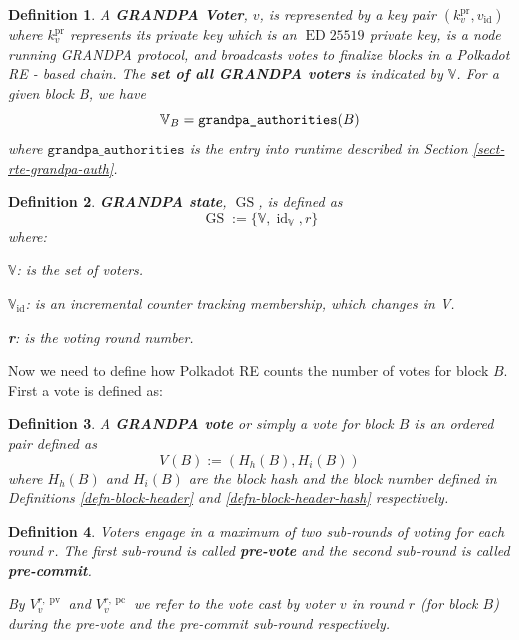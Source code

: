 \documentclass{book}
\newcommand{\assign}{:=}
\newcommand{\nosymbol}{}
\newcommand{\tmop}[1]{\ensuremath{\operatorname{#1}}}
\newcommand{\tmstrong}[1]{\textbf{#1}}
\newcommand{\tmverbatim}[1]{{\ttfamily{#1}}}
\newtheorem{definition}{Definition}
\newtheorem{definition}{Definition}
\begin{document}
\begin{definition}
  A {\tmstrong{GRANDPA Voter}}, $v$, is represented by a key pair
  $(k^{\tmop{pr}}_v, v_{\tmop{id}})$ where $k_v^{\tmop{pr}}$ represents its
  private key which is an $\tmop{ED} 25519$ private key, is a node running
  GRANDPA protocol, and broadcasts votes to finalize blocks in a Polkadot RE -
  based chain. The {\tmstrong{set of all GRANDPA voters}} is indicated by
  $\mathbb{V}$. For a given block B, we have
  \[ \mathbb{V}_B = \text{\tmverbatim{grandpa\_authorities}} (B) \]
  where $\mathtt{grandpa\_authorities}$ is the entry into runtime described in
  Section \ref{sect-rte-grandpa-auth}.
\end{definition}

\begin{definition}
  {\tmstrong{GRANDPA state}}, $\tmop{GS}$, is defined as
  \[ \tmop{GS} \assign \{\mathbb{V}, \tmop{id}_{\mathbb{V}}, r\} \]
  where:
  
  $\mathbb{V}$: is the set of voters.
  
  {\tmstrong{$\mathbb{V}_{\tmop{id}}$}}: is an incremental counter tracking
  \tmverbatim{}membership, which changes in V.
  
  {\tmstrong{r}}: is the votin\tmverbatim{}g round number.
\end{definition}

Now we need to define how Polkadot RE counts the number of votes for block
$B$. First a vote is defined as:

\begin{definition}
  \label{defn-vote}A {\tmstrong{GRANDPA vote }}or simply a vote for block $B$
  is an ordered pair defined as
  \[ V_{\nosymbol} (B) \assign (H_h (B), H_i (B)) \]
  where $H_h (B)$ and $H_i (B)$ are the block hash and the block number
  defined in Definitions \ref{defn-block-header} and
  \ref{defn-block-header-hash} respectively.
\end{definition}

\begin{definition}
  Voters engage in a maximum of two sub-rounds of voting for each round $r$.
  The first sub-round is called {\tmstrong{pre-vote}} and\tmverbatim{} the
  second sub-round is called {\tmstrong{pre-commit}}.
  
  By {\tmstrong{$V_v^{r, \tmop{pv}}$}} and {\tmstrong{$V_v^{r, \tmop{pc}}$}}
  we refer to the vote cast by voter $v$ in round $r$ (for block $B$) during
  the pre-vote and the pre-commit sub-round respectively.
\end{definition}
\end{document}

